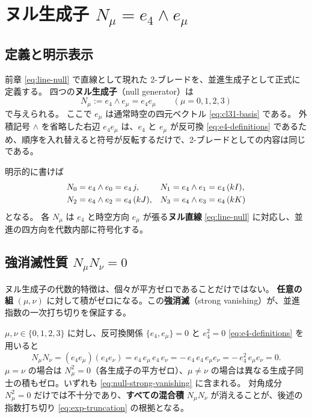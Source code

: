\documentclass[dvipdfmx,a4paper,oneside]{jsbook}
\numberwithin{equation}{chapter}
\begin{document}
\section{\texorpdfstring{ヌル生成子 \(N_\mu = e_4 \wedge e_\mu\)}{ヌル生成子 N mu = e4 wedge e mu}}

\subsection{定義と明示表示}

前章 \eqref{eq:line-null} で直線として現れた 2-ブレードを、並進生成子として正式に定義する。
四つの\textbf{ヌル生成子}（null generator）は
\begin{equation}
  N_\mu := e_4 \wedge e_\mu = e_4 e_\mu
  \qquad (\mu = 0,1,2,3)
  \label{eq:null-generators}
\end{equation}
で与えられる。
ここで \(e_\mu\) は通常時空の四元ベクトル \eqref{eq:cl31-basis} である。
外積記号 \(\wedge\) を省略した右辺 \(e_4 e_\mu\) は、\(e_4\) と \(e_\mu\) が反可換 \eqref{eq:e4-definitions} であるため、順序を入れ替えると符号が反転するだけで、2-ブレードとしての内容は同じである。

明示的に書けば
\begin{align}
  N_0 &= e_4 \wedge e_0 = e_4\, j, &
  N_1 &= e_4 \wedge e_1 = e_4\,(kI), \notag\\
  N_2 &= e_4 \wedge e_2 = e_4\,(kJ), &
  N_3 &= e_4 \wedge e_3 = e_4\,(kK)
  \label{eq:null-explicit}
\end{align}
となる。
各 \(N_\mu\) は \(e_4\) と時空方向 \(e_\mu\) が張る\textbf{ヌル直線} \eqref{eq:line-null} に対応し、並進の四方向を代数内部に符号化する。

\subsection{強消滅性質 \(N_\mu N_\nu = 0\)}

ヌル生成子の代数的特徴は、個々が平方ゼロであることだけではない。
\textbf{任意の組} \((\mu,\nu)\) に対して積がゼロになる。この\textbf{強消滅}（strong vanishing）が、並進指数の一次打ち切りを保証する。

\(\mu,\nu \in \{0,1,2,3\}\) に対し、反可換関係 \(\{e_4, e_\mu\} = 0\) と \(e_4^2 = 0\) \eqref{eq:e4-definitions} を用いると
\begin{equation}
  N_\mu N_\nu
  = (e_4 e_\mu)(e_4 e_\nu)
  = e_4\, e_\mu\, e_4\, e_\nu
  = -\,e_4\, e_4\, e_\mu e_\nu
  = -\,e_4^2\, e_\mu e_\nu
  = 0.
  \label{eq:null-strong-vanishing}
\end{equation}
\(\mu = \nu\) の場合は \(N_\mu^2 = 0\)（各生成子の平方ゼロ）、\(\mu \neq \nu\) の場合は異なる生成子同士の積もゼロ。いずれも \eqref{eq:null-strong-vanishing} に含まれる。
対角成分 \(N_\mu^2 = 0\) だけでは不十分であり、\textbf{すべての混合積} \(N_\mu N_\nu\) が消えることが、後述の指数打ち切り \eqref{eq:exp-truncation} の根拠となる。
\end{document}
